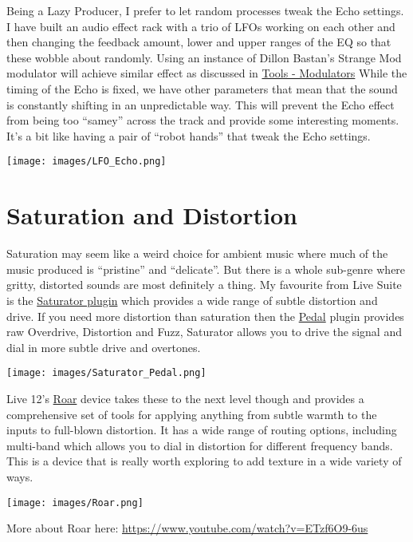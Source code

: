 \documentclass[
  12pt,
  letterpaper,
  oneside,
  open=any]{scrbook}
\begin{document}
Being a Lazy Producer, I prefer to let random processes tweak the Echo
settings. I have built an audio effect rack with a trio of LFOs working
on each other and then changing the feedback amount, lower and upper
ranges of the EQ so that these wobble about randomly. Using an instance
of Dillon Bastan's Strange Mod modulator will achieve similar effect as
discussed in \hyperref[Chapter-007-Tools-Modulators]{Tools - Modulators}
While the timing of the Echo is fixed, we have other parameters that
mean that the sound is constantly shifting in an unpredictable way. This
will prevent the Echo effect from being too ``samey'' across the track
and provide some interesting moments. It's a bit like having a pair of
``robot hands'' that tweak the Echo settings.

\texttt{[image: images/LFO\_Echo.png]}

\section{Saturation and Distortion}\label{saturation-and-distortion}

Saturation may seem like a weird choice for ambient music where much of
the music produced is ``pristine'' and ``delicate''. But there is a
whole sub-genre where gritty, distorted sounds are most definitely a
thing. My favourite from Live Suite is the
\href{https://www.ableton.com/en/live-manual/11/live-audio-effect-reference/\#saturator}{Saturator
plugin} which provides a wide range of subtle distortion and drive. If
you need more distortion than saturation then the
\href{https://www.ableton.com/en/live-manual/11/live-audio-effect-reference/\#pedal}{Pedal}
plugin provides raw Overdrive, Distortion and Fuzz, Saturator allows you
to drive the signal and dial in more subtle drive and overtones.

\texttt{[image: images/Saturator\_Pedal.png]}

Live 12's
\href{https://www.ableton.com/en/live-manual/12/live-audio-effect-reference/\#roar}{Roar}
device takes these to the next level though and provides a comprehensive
set of tools for applying anything from subtle warmth to the inputs to
full-blown distortion. It has a wide range of routing options, including
multi-band which allows you to dial in distortion for different
frequency bands. This is a device that is really worth exploring to add
texture in a wide variety of ways.

\texttt{[image: images/Roar.png]}

More about Roar here: \url{https://www.youtube.com/watch?v=ETzf6O9-6us}
\end{document}
